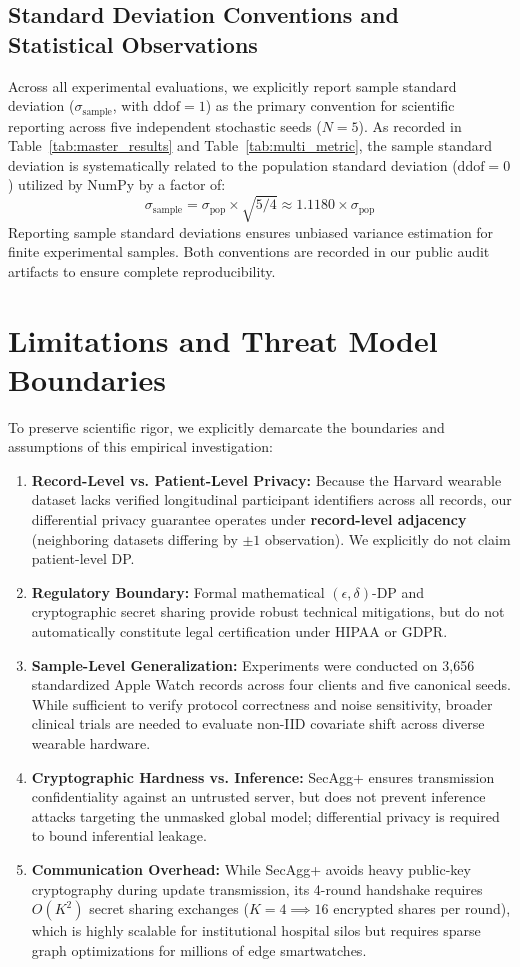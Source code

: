 \documentclass[journal,twocolumn,10pt]{IEEEtran}
\begin{document}
\subsection{Standard Deviation Conventions and Statistical Observations}
Across all experimental evaluations, we explicitly report sample standard deviation ($\sigma_{\text{sample}}$, with $\text{ddof}=1$) as the primary convention for scientific reporting across five independent stochastic seeds ($N=5$). As recorded in Table~\ref{tab:master_results} and Table~\ref{tab:multi_metric}, the sample standard deviation is systematically related to the population standard deviation ($\text{ddof}=0$) utilized by NumPy by a factor of:
\begin{equation}
\sigma_{\text{sample}} = \sigma_{\text{pop}} \times \sqrt{5/4} \approx 1.1180 \times \sigma_{\text{pop}}
\end{equation}
Reporting sample standard deviations ensures unbiased variance estimation for finite experimental samples. Both conventions are recorded in our public audit artifacts to ensure complete reproducibility.

\section{Limitations and Threat Model Boundaries}
To preserve scientific rigor, we explicitly demarcate the boundaries and assumptions of this empirical investigation:
\begin{enumerate}
    \item \textbf{Record-Level vs. Patient-Level Privacy:} Because the Harvard wearable dataset lacks verified longitudinal participant identifiers across all records, our differential privacy guarantee operates under \textbf{record-level adjacency} (neighboring datasets differing by $\pm 1$ observation). We explicitly do not claim patient-level DP.
    \item \textbf{Regulatory Boundary:} Formal mathematical $(\epsilon, \delta)$-DP and cryptographic secret sharing provide robust technical mitigations, but do not automatically constitute legal certification under HIPAA or GDPR.
    \item \textbf{Sample-Level Generalization:} Experiments were conducted on 3,656 standardized Apple Watch records across four clients and five canonical seeds. While sufficient to verify protocol correctness and noise sensitivity, broader clinical trials are needed to evaluate non-IID covariate shift across diverse wearable hardware.
    \item \textbf{Cryptographic Hardness vs. Inference:} SecAgg+ ensures transmission confidentiality against an untrusted server, but does not prevent inference attacks targeting the unmasked global model; differential privacy is required to bound inferential leakage.
    \item \textbf{Communication Overhead:} While SecAgg+ avoids heavy public-key cryptography during update transmission, its 4-round handshake requires $O(K^2)$ secret sharing exchanges ($K=4 \implies 16$ encrypted shares per round), which is highly scalable for institutional hospital silos but requires sparse graph optimizations for millions of edge smartwatches.
\end{enumerate}
\end{document}

